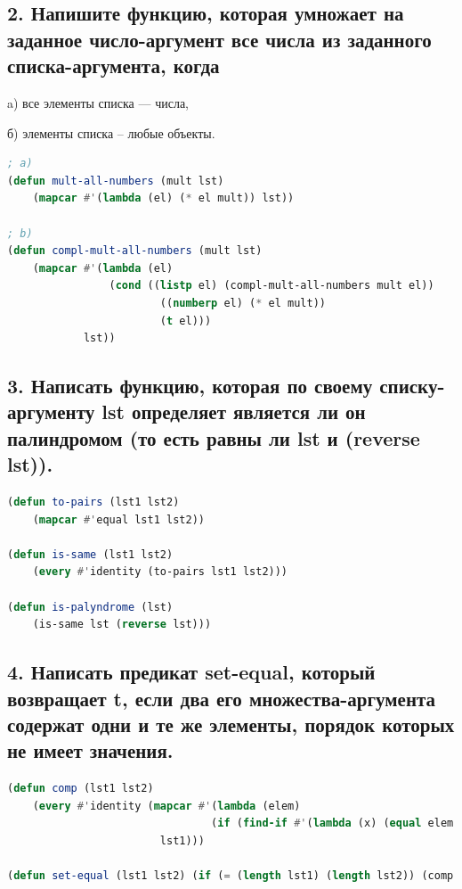 \documentclass[12pt]{report}
\begin{document}
\subsection*{2. Напишите функцию, которая умножает на заданное число-аргумент все числа
	из заданного списка-аргумента, когда}

a) все элементы списка --- числа,

б) элементы списка -- любые объекты.

\begin{lstlisting}[label=6xd, caption=Решение задания №2, language=lisp]
; a)
(defun mult-all-numbers (mult lst)
	(mapcar #'(lambda (el) (* el mult)) lst))
	
; b)
(defun compl-mult-all-numbers (mult lst)
	(mapcar #'(lambda (el) 
				(cond ((listp el) (compl-mult-all-numbers mult el))
						((numberp el) (* el mult))
						(t el)))
			lst))

\end{lstlisting}

\newpage
\subsection*{3. Написать функцию, которая по своему списку-аргументу lst определяет
	является ли он палиндромом (то есть равны ли lst и (reverse lst)).}

\begin{lstlisting}[label=6xd, caption=Решение задания №3, language=lisp]
(defun to-pairs (lst1 lst2)
	(mapcar #'equal lst1 lst2))

(defun is-same (lst1 lst2)
	(every #'identity (to-pairs lst1 lst2)))

(defun is-palyndrome (lst)
	(is-same lst (reverse lst)))

\end{lstlisting}

\subsection*{4. Написать предикат set-equal, который возвращает t, если два его множества-аргумента содержат одни и те же элементы, порядок которых не имеет значения.}

\begin{lstlisting}[label=6xd, caption=Решение задания №4, language=lisp]
(defun comp (lst1 lst2)
	(every #'identity (mapcar #'(lambda (elem)
								(if (find-if #'(lambda (x) (equal elem x)) lst2) T))
						lst1)))

(defun set-equal (lst1 lst2) (if (= (length lst1) (length lst2)) (comp lst1 lst2)))

\end{lstlisting}
\end{document}
